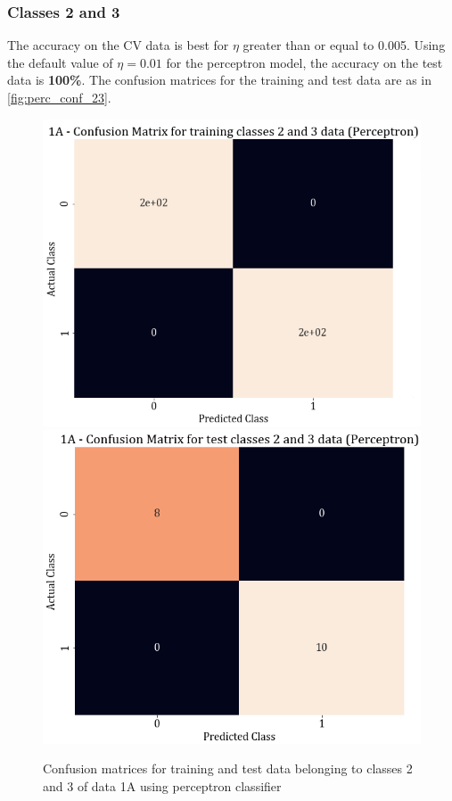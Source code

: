 \documentclass[11pt,a4paper]{article}
\begin{document}
\subsubsection{Classes 2 and 3}

The accuracy on the CV data is best for $\eta$ greater than or equal to 0.005. Using the default value of $\eta = 0.01$ for the perceptron model, the accuracy on the test data is \textbf{100\%}. The confusion matrices for the training and test data are as in \autoref{fig:perc_conf_23}.
\begin{figure}[H]
    \centering
    \includegraphics[scale=0.35]{images/1A_perceptron_training_classes_2_and_3_confmat.png}
    \includegraphics[scale=0.35]{images/1A_perceptron_test_classes_2_and_3_confmat.png}
    \caption{Confusion matrices for training and test data belonging to classes 2 and 3 of data 1A using perceptron classifier}
    \label{fig:perc_conf_23}
\end{figure}
\end{document}
